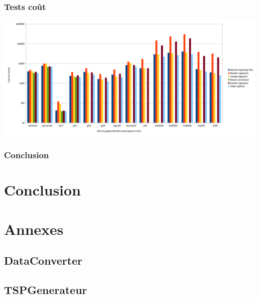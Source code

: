 \documentclass[10pt,a4paper]{report}
\begin{document}
	\subsubsection{Tests coût}
			\includegraphics[scale=0.45]{./Ressource/cout_graphes_site.png}
			
	\subsubsection{Conclusion}

\section{Conclusion}
\section{Annexes}

	\subsection{DataConverter}
	
	\subsection{TSPGenerateur}
\end{document}

